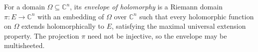 
For a domain $\Omega\subseteq\mathbb C^n$, its \emph{envelope of holomorphy} is a Riemann domain $\pi:E\to\mathbb C^n$ with an embedding of $\Omega$ over $\mathbb C^n$ such that every holomorphic function on $\Omega$ extends holomorphically to $E$, satisfying the maximal universal extension property. The projection $\pi$ need not be injective, so the envelope may be multisheeted.
